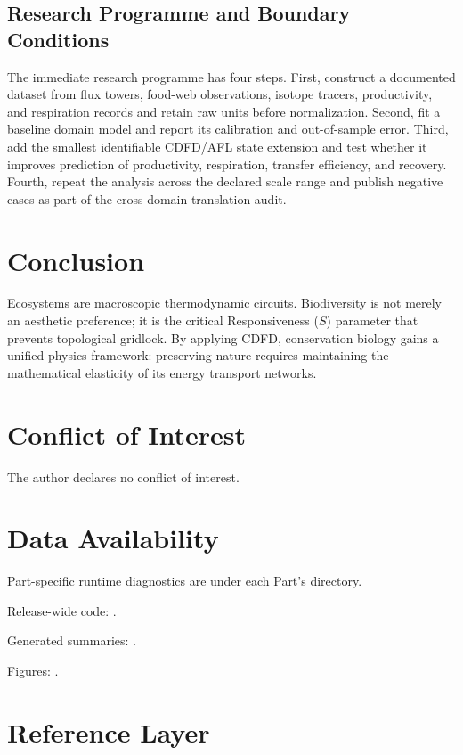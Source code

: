 \documentclass[11pt,a4paper]{article}
\begin{document}
\subsection{Research Programme and Boundary Conditions}

The immediate research programme has four steps. First, construct a documented
dataset from flux towers, food-web observations, isotope tracers, productivity, and respiration records and retain raw units before normalization.
Second, fit a baseline domain model and report its calibration and out-of-sample
error. Third, add the smallest identifiable CDFD/AFL state extension and test
whether it improves prediction of productivity, respiration, transfer efficiency, and recovery. Fourth, repeat the
analysis across the declared scale range and publish negative cases as part of
the cross-domain translation audit.


\section{Conclusion}
Ecosystems are macroscopic thermodynamic circuits. Biodiversity is not merely an aesthetic preference; it is the critical Responsiveness ($S$) parameter that prevents topological gridlock. By applying CDFD, conservation biology gains a unified physics framework: preserving nature requires maintaining the mathematical elasticity of its energy transport networks.
\section*{Conflict of Interest} The author declares no conflict of interest.
\section*{Data Availability}
Part-specific runtime diagnostics are under each Part's  directory.

Release-wide code: .

Generated summaries: .

Figures: .


\section{Reference Layer}


\end{document}
